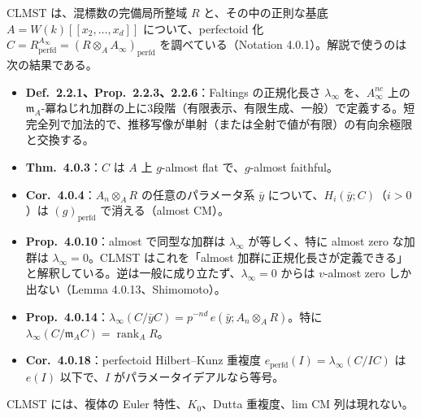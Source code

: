 \documentclass[11pt,a4paper]{ltjsarticle}
\numberwithin{equation}{section}
\theoremstyle{plain}
\theoremstyle{definition}
\theoremstyle{definition}
\newcommand{\m}{\mathfrak{m}}
\newcommand{\rank}{\operatorname{rank}}
\begin{document}
CLMST は、混標数の完備局所整域 $R$ と、その中の正則な基底 $A = W(k)[[x_2,\dots,x_d]]$ について、perfectoid 化 $C = R^{A_\infty}_{\mathrm{perfd}} = (R\otimes_A A_\infty)_{\mathrm{perfd}}$ を調べている（Notation 4.0.1）。解説で使うのは次の結果である。
\begin{itemize}
  \item \textbf{Def.~2.2.1、Prop.~2.2.3、2.2.6}：Faltings の正規化長さ $\lambda_\infty$ を、$A_\infty^{nc}$ 上の $\m_A$-冪ねじれ加群の上に3段階（有限表示、有限生成、一般）で定義する。短完全列で加法的で、推移写像が単射（または全射で値が有限）の有向余極限と交換する。
  \item \textbf{Thm.~4.0.3}：$C$ は $A$ 上 $g$-almost flat で、$g$-almost faithful。
  \item \textbf{Cor.~4.0.4}：$A_n\otimes_A R$ の任意のパラメータ系 $\bar y$ について、$H_i(\bar y; C)$（$i>0$）は $(g)_{\mathrm{perfd}}$ で消える（almost CM）。
  \item \textbf{Prop.~4.0.10}：almost で同型な加群は $\lambda_\infty$ が等しく、特に almost zero な加群は $\lambda_\infty = 0$。CLMST はこれを「almost 加群に正規化長さが定義できる」と解釈している。逆は一般に成り立たず、$\lambda_\infty = 0$ からは $v$-almost zero しか出ない（Lemma 4.0.13、Shimomoto）。
  \item \textbf{Prop.~4.0.14}：$\lambda_\infty(C/\bar yC) = p^{-nd}\,e(\bar y; A_n\otimes_A R)$。特に $\lambda_\infty(C/\m_A C) = \rank_A R$。
  \item \textbf{Cor.~4.0.18}：perfectoid Hilbert--Kunz 重複度 $e_{\mathrm{perfd}}(I) = \lambda_\infty(C/IC)$ は $e(I)$ 以下で、$I$ がパラメータイデアルなら等号。
\end{itemize}
CLMST には、複体の Euler 特性、$K_0$、Dutta 重複度、lim CM 列は現れない。
\end{document}
